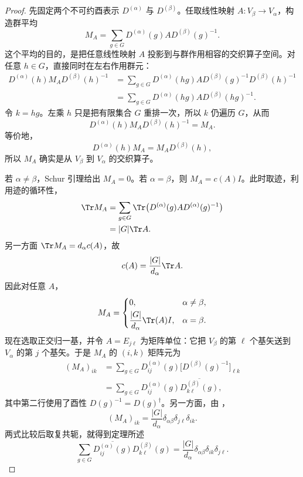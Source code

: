 \begin{proof}
先固定两个不可约酉表示 $D^{(\alpha)}$ 与 $D^{(\beta)}$。任取线性映射 $A:V_\beta\to V_\alpha$，构造群平均
\[
M_A=\sum_{g\in G}D^{(\alpha)}(g)A D^{(\beta)}(g)^{-1}.
\]
这个平均的目的，是把任意线性映射 $A$ 投影到与群作用相容的交织算子空间。对任意 $h\in G$，直接同时在左右作用群元：
\begin{align*}
D^{(\alpha)}(h)M_A D^{(\beta)}(h)^{-1}
&=\sum_{g\in G}
D^{(\alpha)}(hg)A
D^{(\beta)}(g)^{-1}D^{(\beta)}(h)^{-1}\\
&=\sum_{g\in G}
D^{(\alpha)}(hg)A D^{(\beta)}(hg)^{-1}.
\end{align*}
令 $k=hg$。左乘 $h$ 只是把有限集合 $G$ 重排一次，所以 $k$ 仍遍历 $G$，从而
\[
D^{(\alpha)}(h)M_A D^{(\beta)}(h)^{-1}=M_A.
\]
等价地，
\[
D^{(\alpha)}(h)M_A=M_A D^{(\beta)}(h),
\]
所以 $M_A$ 确实是从 $V_\beta$ 到 $V_\alpha$ 的交织算子。

若 $\alpha\neq\beta$，Schur 引理给出 $M_A=0$。若 $\alpha=\beta$，则 $M_A=c(A)I$。此时取迹，利用迹的循环性，
\begin{align*}
\Tr M_A
&=\sum_{g\in G}\Tr\bigl(D^{(\alpha)}(g)A D^{(\alpha)}(g)^{-1}\bigr)\\
&=|G|\Tr A.
\end{align*}
另一方面 $\Tr M_A=d_\alpha c(A)$，故
\[
c(A)=\frac{|G|}{d_\alpha}\Tr A.
\]
因此对任意 $A$，
\begin{equation}
M_A=
\begin{cases}
0,&\alpha\neq\beta,\\[1mm]
\dfrac{|G|}{d_\alpha}\Tr(A)I,&\alpha=\beta.
\end{cases}
\label{eq:averaged-intertwiner}
\end{equation}
现在选取正交归一基，并令 $A=E_{j\ell}$ 为矩阵单位：它把 $V_\beta$ 的第 $\ell$ 个基矢送到 $V_\alpha$ 的第 $j$ 个基矢。于是 $M_A$ 的 $(i,k)$ 矩阵元为
\begin{align*}
(M_A)_{ik}
&=\sum_{g\in G}
D^{(\alpha)}_{ij}(g)
\bigl[D^{(\beta)}(g)^{-1}\bigr]_{\ell k}\\
&=\sum_{g\in G}
D^{(\alpha)}_{ij}(g)
\overline{D^{(\beta)}_{k\ell}(g)},
\end{align*}
其中第二行使用了酉性 $D(g)^{-1}=D(g)^\dagger$。另一方面，由 ，
\[
(M_A)_{ik}
=\frac{|G|}{d_\alpha}
\delta_{\alpha\beta}\delta_{j\ell}\delta_{ik}.
\]
两式比较后取复共轭，就得到定理所述
\[
\sum_{g\in G}
\overline{D^{(\alpha)}_{ij}(g)}D^{(\beta)}_{k\ell}(g)
=\frac{|G|}{d_\alpha}
\delta_{\alpha\beta}\delta_{ik}\delta_{j\ell}.
\]
\end{proof}
